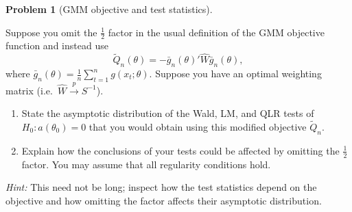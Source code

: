 \documentclass[12pt]{article}
\theoremstyle{definition}
\newtheorem{problem}{Problem}
\theoremstyle{plain}
\begin{document}
\vspace{0.8em}

\begin{problem}[GMM objective and test statistics]
\label{prob:gmm-half}

Suppose you omit the $\frac{1}{2}$ factor in the usual definition of the GMM objective function and instead use
\[
\tilde{Q}_n(\theta) = -\bar{g}_n(\theta)' \hat{W} \bar{g}_n(\theta),
\]
where $\bar{g}_n(\theta) = \frac{1}{n}\sum_{t=1}^n g(x_t; \theta)$. Suppose you have an optimal weighting matrix (i.e.\ $\hat{W} \xrightarrow{p} S^{-1}$).

\begin{enumerate}[label=(\alph*)]
\item State the asymptotic distribution of the Wald, LM, and QLR tests of $H_0\colon a(\theta_0) = 0$ that you would obtain using this modified objective $\tilde{Q}_n$.
\item Explain how the conclusions of your tests could be affected by omitting the $\frac{1}{2}$ factor. You may assume that all regularity conditions hold.
\end{enumerate}

\noindent\textit{Hint:} This need not be long; inspect how the test statistics depend on the objective and how omitting the factor affects their asymptotic distribution.
\end{problem}

\vspace{0.8em}
\end{document}

